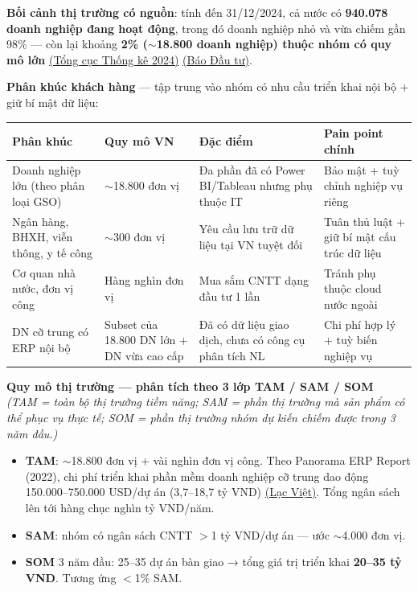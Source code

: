 \documentclass[11pt,a4paper]{article}
\begin{document}
\textbf{Bối cảnh thị trường có nguồn}: tính đến 31/12/2024, cả nước có \textbf{940.078 doanh nghiệp đang hoạt động}, trong đó doanh nghiệp nhỏ và vừa chiếm gần 98\% --- còn lại khoảng \textbf{2\% ($\sim$18.800 doanh nghiệp) thuộc nhóm có quy mô lớn} \href{https://www.gso.gov.vn/du-lieu-va-so-lieu-thong-ke/2025/01/tinh-hinh-doanh-nghiep-gia-nhap-va-tai-gia-nhap-thi-truong-nam-2024/}{(Tổng cục Thống kê 2024)} \href{https://baodautu.vn/chiem-gan-98-tong-so-doanh-nghiep-doanh-nghiep-nho-va-vua-dang-o-dau-trong-nen-kinh-te-d249574.html}{(Báo Đầu tư)}.

\textbf{Phân khúc khách hàng} --- tập trung vào nhóm có nhu cầu triển khai nội bộ + giữ bí mật dữ liệu:

\begin{longtable}{|L{3.4cm}|L{3.5cm}|L{4cm}|L{3.5cm}|}
\hline
{}\textbf{Phân khúc} & \textbf{Quy mô VN} & \textbf{Đặc điểm} & \textbf{Pain point chính} \\
\hline\endhead

Doanh nghiệp lớn (theo phân loại GSO) & $\sim$18.800 đơn vị & Đa phần đã có Power BI/Tableau nhưng phụ thuộc IT & Bảo mật + tuỳ chỉnh nghiệp vụ riêng \\ \hline
Ngân hàng, BHXH, viễn thông, y tế công & $\sim$300 đơn vị & Yêu cầu lưu trữ dữ liệu tại VN tuyệt đối & Tuân thủ luật + giữ bí mật cấu trúc dữ liệu \\ \hline
Cơ quan nhà nước, đơn vị công & Hàng nghìn đơn vị & Mua sắm CNTT dạng đầu tư 1 lần & Tránh phụ thuộc cloud nước ngoài \\ \hline
DN cỡ trung có ERP nội bộ & Subset của 18.800 DN lớn + DN vừa cao cấp & Đã có dữ liệu giao dịch, chưa có công cụ phân tích NL & Chi phí hợp lý + tuỳ biến nghiệp vụ \\ \hline

\end{longtable}

\textbf{Quy mô thị trường --- phân tích theo 3 lớp TAM / SAM / SOM}\\
\textit{(TAM = toàn bộ thị trường tiềm năng; SAM = phần thị trường mà sản phẩm có thể phục vụ thực tế; SOM = phần thị trường nhóm dự kiến chiếm được trong 3 năm đầu.)}

\begin{itemize}
\item \textbf{TAM}: $\sim$18.800 đơn vị + vài nghìn đơn vị công. Theo Panorama ERP Report (2022), chi phí triển khai phần mềm doanh nghiệp cỡ trung dao động 150.000--750.000 USD/dự án (3,7--18,7 tỷ VND) \href{https://lacviet.vn/en/chi-phi-trien-khai-erp-bao-nhieu/}{(Lạc Việt)}. Tổng ngân sách lên tới hàng chục nghìn tỷ VND/năm.
\item \textbf{SAM}: nhóm có ngân sách CNTT $>$1 tỷ VND/dự án --- ước $\sim$4.000 đơn vị.
\item \textbf{SOM} 3 năm đầu: 25--35 dự án bàn giao → tổng giá trị triển khai \textbf{20--35 tỷ VND}. Tương ứng $<$1\% SAM.
\end{itemize}
\end{document}
